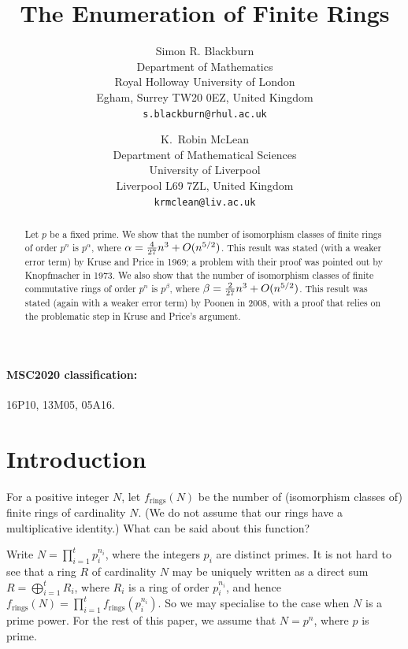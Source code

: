 \documentclass[12pt]{article}
\newcommand{\Oh}{\mathnormal{O}}
\newcommand{\fr}{f_\mathrm{rings}}
\begin{document}
\title{The Enumeration of Finite Rings}
\author{Simon R. Blackburn\\
Department of Mathematics\\
Royal Holloway University of London\\
Egham, Surrey TW20 0EZ, United Kingdom\\
\texttt{s.blackburn@rhul.ac.uk}\\
\and
K.~Robin McLean \\ 
Department of Mathematical Sciences\\
University of Liverpool\\
Liverpool L69 7ZL, United Kingdom
\\
\texttt{krmclean@liv.ac.uk}}
\maketitle

\begin{abstract}
Let $p$ be a fixed prime. We show that the number of isomorphism classes of finite rings of order $p^n$ is $p^\alpha$, where $\alpha=\frac{4}{27}n^3+\Oh(n^{5/2})$. This result was stated (with a weaker error term) by Kruse and Price in 1969; a problem with their proof was pointed out by Knopfmacher in 1973. We also show that the number of isomorphism classes of finite commutative rings of order $p^n$ is $p^\beta$, where $\beta=\frac{2}{27}n^3+\Oh(n^{5/2})$. This result was stated (again with a weaker error term) by Poonen in 2008, with a proof that relies on the problematic step in Kruse and Price's argument. 
\end{abstract}

\paragraph{MSC2020 classification:} 16P10, 13M05, 05A16.

\section{Introduction}

For a positive integer $N$, let $\fr(N)$ be the number of (isomorphism classes of) finite rings of cardinality $N$. (We do not assume that our rings have a multiplicative identity.) What can be said about this function? 

Write $N=\prod_{i=1}^t p_i^{n_i}$, where the integers $p_i$ are distinct primes. It is not hard to see that a ring $R$ of cardinality $N$ may be uniquely written as a direct sum
$R=\bigoplus_{i=1}^t R_i$, where $R_i$  is a ring of order $p_i^{n_i}$,
and hence
$\fr(N)=\prod_{i=1}^t\fr(p_i^{n_i})$.
So we may specialise to the case when $N$ is a prime power. For the rest of this paper, we assume that $N=p^n$, where $p$ is prime. 
\end{document}
